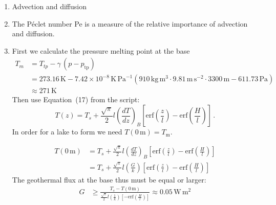 \documentclass[DIV15,11pt,parskip=half]{scrartcl}
\begin{document}
\begin{enumerate}
\item Advection and diffusion
\item The P\'eclet number Pe is a measure of the relative importance of advection and diffusion.
\item First we calculate the pressure melting point at the base
\begin{align*}
 \label{eq:clausius-pure}
 T_m &= T_{tp} - \gamma\, (p - p_{\text{tp}}) \\
 & = 273.16\,\text{K} -  7.42 \times 10^{-8} \,\text{K}\,\text{Pa}^{-1} \left(  910\,\text{kg}\,\text{m}^{3} \cdot 9.81\,\text{m}\,\text{s}^{-2}\cdot 3300\,\text{m}- 611.73\,\text{Pa}\right) \\
 & \approx 271\,\text{K}
\end{align*} Then use Equation~(17) from the script:
\begin{equation*}
  T(z) = T_s + \frac{\sqrt\pi}{2} l \left(\frac{dT}{dz}\right)_{B} 
 \left[ {\textrm{erf}} \left( \frac{z}{l} \right) - {\textrm{erf}} \left( \frac{H}{l} \right) \right]\,.
\end{equation*} In order for a lake to form we need $T(0\,\text{m}) = T_{\text{m}}$.

\begin{align*}
  T(0\,\text{m}) & = T_s + \frac{\sqrt\pi}{2} l \left(\frac{dT}{dz}\right)_{B} 
 \left[ {\textrm{erf}} \left( \frac{z}{l} \right) - {\textrm{erf}} \left( \frac{H}{l} \right) \right] \\
 & = T_s + \frac{\sqrt\pi}{2} l \left(\frac{G}{k}\right) 
 \left[ {\textrm{erf}} \left( \frac{z}{l} \right) - {\textrm{erf}} \left( \frac{H}{l} \right) \right]
\end{align*}
The geothermal flux at the base thus must be equal or larger:
\begin{align*}
 G & \ge \frac{T_s - T(0\,\text{m})}{\frac{\sqrt\pi}{2} l \left(\frac{1}{k}\right) 
 \left[  - {\textrm{erf}} \left( \frac{H}{l} \right) \right]} \approx 0.05\,\text{W}\,\text{m}^{2}
\end{align*}


\end{enumerate}
\end{document}

